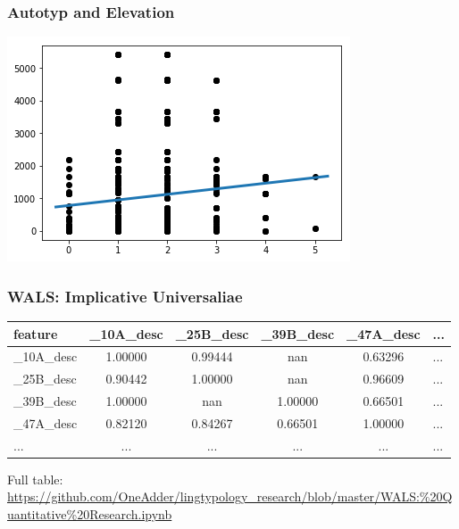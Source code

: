 \documentclass{beamer}
\begin{document}
\begin{frame}
 \frametitle{Autotyp and Elevation}
 \includegraphics[width=\textwidth]{images/AutotypRegr.png}
\end{frame}

\begin{frame}
\frametitle{WALS: Implicative Universaliae}
\begin{adjustbox}{max width=\textwidth}
\begin{tabular}{|l|cccc|l|}
\hline
feature & \_10A\_desc & \_25B\_desc & \_39B\_desc & \_47A\_desc & ... \\
\hline
\_10A\_desc &   1.00000 &   0.99444 &       nan &   0.63296 &   ... \\
\_25B\_desc &   0.90442 &   1.00000 &       nan &   0.96609 &   ... \\
\_39B\_desc &   1.00000 &       nan &   1.00000 &   0.66501 &   ... \\
\_47A\_desc &   0.82120 &   0.84267 &   0.66501 &   1.00000 &   ... \\
\hline
... &   ... &   ... &       ... &   ... &   ... \\
\hline
\end{tabular}
\end{adjustbox}
Full table: \url{https://github.com/OneAdder/lingtypology_research/blob/master/WALS:\%20Quantitative\%20Research.ipynb}
\end{frame}
\end{document}

